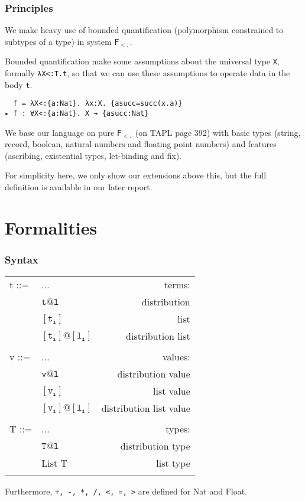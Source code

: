 \documentclass{beamer}
\begin{document}
\begin{frame}[fragile]
\frametitle{Principles}

We make heavy use of bounded quantification (polymorphism constrained to subtypes of a type) in system $\mathsf{F_{<:}}$.

Bounded quantification make some assumptions about the universal type \verb|X|, formally \verb|λX<:T.t|, so that we can use these assumptions to operate data in the body \verb|t|.

\begin{example}
    \verb|  f = λX<:{a:Nat}. λx:X. {asucc=succ(x.a)}|
    \\
    \verb|▸ f : ∀X<:{a:Nat}. X → {asucc:Nat}|
\end{example}

We base our language on pure $\mathsf{F_{<:}}$ (on TAPL page 392) with basic types (string, record, boolean, natural numbers and floating point numbers) and features (ascribing, existential types, let-binding and fix).

For simplicity here, we only show our extensions above this, but the full definition is available in our later report.

\end{frame}

\section{Formalities}

\begin{frame}[fragile]
    \frametitle{Syntax}
    \centering
    \begin{tabular}{llr}
        t ::= & ... & terms: \\
        & $\mathtt{t @ l}$ & distribution \\
        & $\mathtt{[t_i]}$ & list \\
        & $\mathtt{[t_i] @ [l_i]}$ & distribution list \\
        & & \\
        v ::= & ... & values: \\
        & $\mathtt{v @ l}$ & distribution value \\
        & $\mathtt{[v_i]}$ & list value \\
        & $\mathtt{[v_i] @ [l_i]}$ & distribution list value \\
        & & \\
        T ::= & ... & types: \\
        & $\mathtt{T @ l}$ & distribution type \\
        & List T & list type \\
        & & \\
    \end{tabular}

    Furthermore, \verb|+, -, *, /, <, =, >| are defined for Nat and Float. 

\end{frame}
\end{document}
